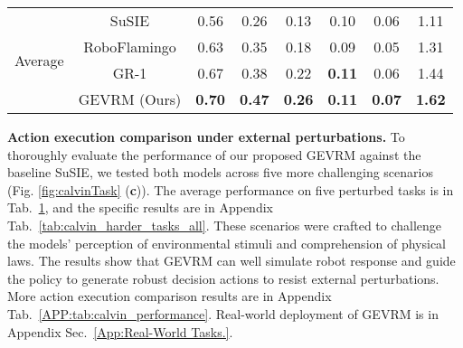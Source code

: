 \begin{table}[ht]
\begin{tabular}{l c ccccc c}
       \multirow{4}{*}{Average} & SuSIE & 0.56 & 0.26 & 0.13 & 0.10 & 0.06 & 1.11 \\
         & RoboFlamingo & 0.63&0.35&0.18&0.09&0.05&1.31  \\
         & GR-1 & 0.67&0.38&0.22& \textbf{0.11} &0.06&1.44  \\
        & GEVRM (Ours)  & \textbf{0.70} & \textbf{0.47} & \textbf{0.26} & \textbf{0.11} & \textbf{0.07} & \textbf{1.62} \\
        
        \bottomrule
    \end{tabular}
    \label{tab:calvin_harder_tasks}
    \vspace{-1em}
\end{table}

\textbf{Action execution comparison under external perturbations.}
To thoroughly evaluate the performance of our proposed GEVRM against the baseline SuSIE, we tested both models across five more challenging scenarios (Fig. \ref{fig:calvinTask} (\textbf{c})). 
The average performance on five perturbed tasks is in Tab.~\ref{tab:calvin_harder_tasks}, and the specific results are in Appendix Tab.~\ref{tab:calvin_harder_tasks_all}.
These scenarios were crafted to challenge the models' perception of environmental stimuli and comprehension of physical laws. 
The results show that GEVRM can well simulate robot response and guide the policy to generate robust decision actions to resist external perturbations.
More action execution comparison results are in Appendix Tab.~\ref{APP:tab:calvin_performance}.
Real-world deployment of GEVRM is in Appendix Sec.~\ref{App:Real-World Tasks.}.



